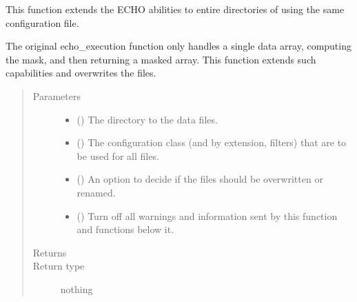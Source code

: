 \documentclass[letterpaper,10pt,english]{sphinxmanual}
\begin{document}
\begin{fulllineitems}
\label{\detokenize{python_docstrings/IfA_Smeargle.echo.echo_main:IfA_Smeargle.echo.echo_main.echo_directory_execution}}
This function extends the ECHO abilities to entire directories of
using the same configuration file.

The original echo\_execution function only handles a single data array,
computing the mask, and then returning a masked array. This function
extends such capabilities and overwrites the files.
\begin{quote}\begin{description}
\item[{Parameters}] \leavevmode\begin{itemize}
\item {} 
 () \textendash{} The directory to the data files.

\item {} 
 ({\hyperref[\detokenize{python_docstrings/IfA_Smeargle.yankee.yankee_main:IfA_Smeargle.yankee.yankee_main.SmeargleConfig}]{}}) \textendash{} The configuration class (and by extension, filters) that are to be
used for all files.

\item {} 
 (\sphinxstyleliteralemphasis{\sphinxupquote{ (}}\sphinxstyleliteralemphasis{\sphinxupquote{)}}) \textendash{} An option to decide if the files should be overwritten or renamed.

\item {} 
 (\sphinxstyleliteralemphasis{\sphinxupquote{ (}}\sphinxstyleliteralemphasis{\sphinxupquote{)}}) \textendash{} Turn off all warnings and information sent by this function and
functions below it.

\end{itemize}

\item[{Returns}] \leavevmode


\item[{Return type}] \leavevmode
nothing

\end{description}\end{quote}

\end{fulllineitems}
\end{document}
